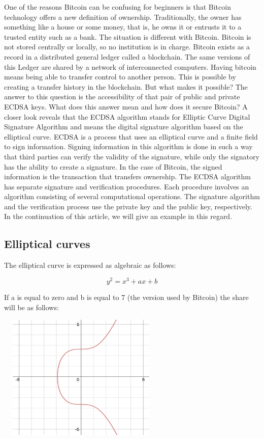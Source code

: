 \begin{flushleft}
One of the reasons Bitcoin can be confusing for beginners is that Bitcoin technology offers a new definition of ownership. Traditionally, the owner has something like a house or some money, that is, he owns it or entrusts it to a trusted entity such as a bank.
The situation is different with Bitcoin. Bitcoin is not stored centrally or locally, so no institution is in charge. Bitcoin exists as a record in a distributed general ledger called a blockchain. The same versions of this Ledger are shared by a network of interconnected computers. Having bitcoin means being able to transfer control to another person. This is possible by creating a transfer history in the blockchain. But what makes it possible? The answer to this question is the accessibility of that pair of public and private ECDSA keys. What does this answer mean and how does it secure Bitcoin?
A closer look reveals that the ECDSA algorithm stands for Elliptic Curve Digital Signature Algorithm and means the digital signature algorithm based on the elliptical curve. ECDSA is a process that uses an elliptical curve and a finite field to sign information. Signing information in this algorithm is done in such a way that third parties can verify the validity of the signature, while only the signatory has the ability to create a signature. In the case of Bitcoin, the signed information is the transaction that transfers ownership.
The ECDSA algorithm has separate signature and verification procedures. Each procedure involves an algorithm consisting of several computational operations. The signature algorithm and the verification process use the private key and the public key, respectively. In the continuation of this article, we will give an example in this regard.

\subsection{Elliptical curves}
The elliptical curve is expressed as algebraic as follows:

\begin{equation}
y^2=x^3+ax+b
\end{equation}

If a is equal to zero and b is equal to 7 (the version used by Bitcoin) the share will be as follows:
\end{flushleft}
\centering\includegraphics[width=8cm, height=6cm]{charts/1.png}

